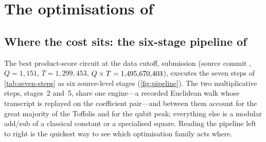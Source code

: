 \section{The optimisations of \ecdsafail{}}\label{sec:opts}

\subsection{Where the cost sits: the six-stage pipeline of }\label{sec:pipeline}

The best product-score circuit at the data cutoff, submission  (source commit , $Q=1{,}151$, $T=1{,}299{,}453$, $Q\times T=1{,}495{,}670{,}403$), executes the seven steps of \cref{tab:seven-steps} as six source-level stages (\cref{fig:pipeline}). The two multiplicative steps, stages~2 and~5, share one engine---a recorded Euclidean walk whose transcript is replayed on the coefficient pair---and between them account for the great majority of the Toffolis and for the qubit peak; everything else is a modular add/sub of a classical constant or a specialised square. Reading the pipeline left to right is the quickest way to see which optimisation family acts where.

